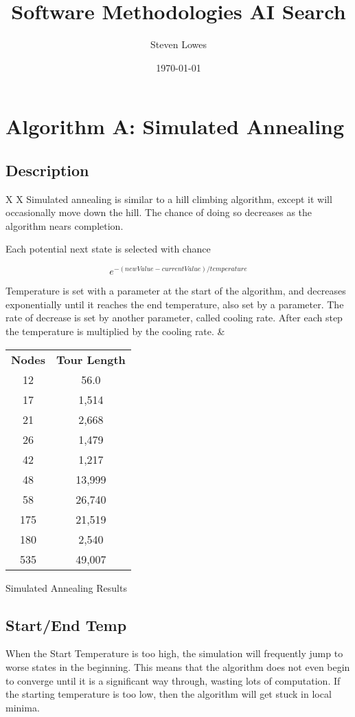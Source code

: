 \documentclass[a4paper, 11pt,table]{article}
\author{Steven Lowes}
\title{Software Methodologies AI Search}
\date{\today{}}
\begin{document}
	
	\section{Algorithm A: Simulated Annealing}

	\subsection{Description}
	\begin{tabu}{X X[c]}
		Simulated annealing is similar to a hill climbing algorithm, except it will occasionally move down the hill. The chance of doing so decreases as the algorithm nears completion.
		
		Each potential next state is selected with chance
		
		\begin{equation}
		e^{-(newValue - currentValue) / temperature}
		\end{equation}
		
		Temperature is set with a parameter at the start of the algorithm, and decreases exponentially until it reaches the end temperature, also set by a parameter. The rate of decrease is set by another parameter, called cooling rate. After each step the temperature is multiplied by the cooling rate.
		&
		\begin{tabu}{|c c|}\hline
			\textbf{Nodes} & \textbf{Tour Length} \\
			12 & 56.0 \\
			17 & 1,514 \\
			21 & 2,668 \\
			26 & 1,479 \\
			42 & 1,217 \\
			48 & 13,999 \\
			58 & 26,740 \\
			175 & 21,519 \\
			180 & 2,540 \\
			535 & 49,007 \\\hline
		\end{tabu}
	
		\vspace{6pt}
		Simulated Annealing Results
	\end{tabu}
		
	\subsection{Start/End Temp}
	When the Start Temperature is too high, the simulation will frequently jump to worse states in the beginning. This means that the algorithm does not even begin to converge until it is a significant way through, wasting lots of computation. If the starting temperature is too low, then the algorithm will get stuck in local minima.
	
\end{document}
